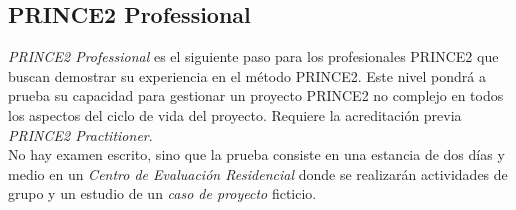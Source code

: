 \subsection{PRINCE2 Professional}
\emph{PRINCE2 Professional} es el siguiente paso para los profesionales PRINCE2 que buscan demostrar su experiencia en el método PRINCE2. Este nivel pondrá a prueba su capacidad para gestionar un proyecto PRINCE2 no complejo en todos los aspectos del ciclo de vida del proyecto. Requiere la acreditación previa \emph{PRINCE2 Practitioner}.\\

No hay examen escrito, sino que la prueba consiste en una estancia de dos días y medio en un \emph{Centro de Evaluación Residencial} donde se realizarán actividades de grupo y un estudio de un \emph{caso de proyecto} ficticio.